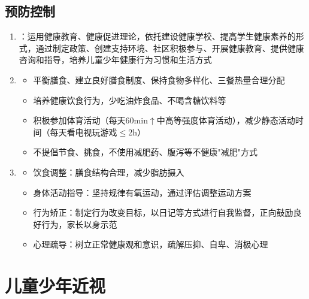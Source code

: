 \subsection{预防控制}

\begin{keybox}
\begin{enumerate}[leftmargin=*]
    \item {}：运用健康教育、健康促进理论，依托建设健康学校、提高学生健康素养的形式，通过制定政策、创建支持环境、社区积极参与、开展健康教育、提供健康咨询和指导，培养儿童少年健康行为习惯和生活方式
    \item {}
    \begin{itemize}[leftmargin=*]
        \item 平衡膳食、建立良好膳食制度、保持食物多样化、三餐热量合理分配
        \item 培养健康饮食行为，少吃油炸食品、不喝含糖饮料等
        \item 积极参加体育活动（每天60min$\uparrow$中高等强度体育活动），减少静态活动时间（每天看电视玩游戏$\leq$2h）
        \item 不提倡节食、挑食，不使用减肥药、腹泻等不健康"减肥"方式
    \end{itemize}
    \item {}
    \begin{itemize}[leftmargin=*]
        \item 饮食调整：膳食结构合理，减少脂肪摄入
        \item 身体活动指导：坚持规律有氧运动，通过评估调整运动方案
        \item 行为矫正：制定行为改变目标，以日记等方式进行自我监督，正向鼓励良好行为，家长以身示范
        \item 心理疏导：树立正常健康观和意识，疏解压抑、自卑、消极心理
    \end{itemize}
\end{enumerate}
\end{keybox}

\section{儿童少年近视}

